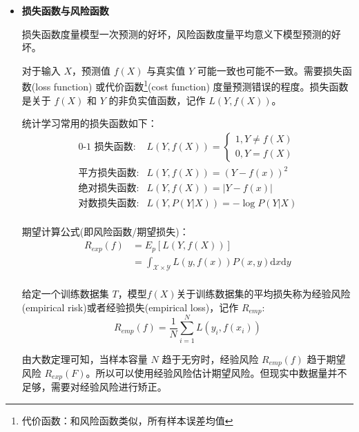 \begin{itemize}
    \item \textbf{损失函数与风险函数} 

    损失函数度量模型一次预测的好坏，风险函数度量平均意义下模型预测的好坏。

    对于输入 $X$，预测值 $f(X)$ 与真实值 $Y$ 可能一致也可能不一致。需要损失函数(loss function) 或代价函数\footnote{代价函数：和风险函数类似，所有样本误差均值}(cost function) 度量预测错误的程度。损失函数是关于 $f(X)$ 和 $Y$ 的非负实值函数，记作 $L(Y,f(X))$。

    统计学习常用的损失函数如下：
    \begin{equation}
        \begin{aligned}
            \text{0-1 损失函数}:& L(Y,f(X)) = 
                \left\{\begin{aligned}
                    1, Y \neq f(X) \\
                    0, Y = f(X)
                \end{aligned} \right.\\
            \text{平方损失函数}:& L(Y,f(X)) = (Y-f(x))^2 \\
            \text{绝对损失函数}:& L(Y,f(X)) = |Y-f(x)| \\
            \text{对数损失函数}:& L(Y,P(Y|X)) = -\log P(Y|X) \\
        \end{aligned}
    \end{equation} 

    期望计算公式(即风险函数/期望损失)：
    \begin{equation}
        \begin{aligned}
            R_{exp}(f) & = E_p[L(Y,f(X))] \\
            & = \int_{\mathcal{X}\times \mathcal{Y}} L(y,f(x))P(x,y)\mathrm{d}x\mathrm{d}y\\
        \end{aligned}
    \end{equation}

    给定一个训练数据集 $T$，模型$f(X)$关于训练数据集的平均损失称为经验风险(empirical risk)或者经验损失(empirical loss)，记作 $R_{emp}$:
    \begin{equation}
        R_{emp}(f) = \frac{1}{N}\sum_{i=1}^{N} L(y_i,f(x_i))
    \end{equation}

    由大数定理可知，当样本容量 $N$ 趋于无穷时，经验风险 $R_{emp}(f)$ 趋于期望风险 $R_{exp}(F)$。所以可以使用经验风险估计期望风险。但现实中数据量并不足够，需要对经验风险进行矫正。


\end{itemize}
